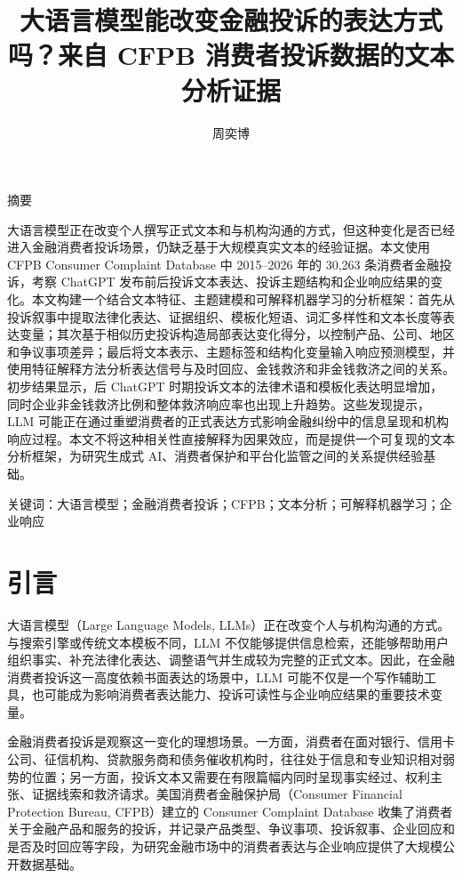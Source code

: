 \documentclass[UTF8]{ctexart}
\title{大语言模型能改变金融投诉的表达方式吗？来自 CFPB 消费者投诉数据的文本分析证据}
\author{周奕博}
\date{}
\renewenvironment{abstract}
  {\begin{center}
   {\large 摘要\par}
   \vspace{0.5em}
   \begin{minipage}{0.92\linewidth}
   \normalfont\normalsize}
  {\end{minipage}
   \end{center}}
\begin{document}
\maketitle
\begingroup
\renewcommand{\thefootnote}{}
\endgroup

\begin{abstract}
大语言模型正在改变个人撰写正式文本和与机构沟通的方式，但这种变化是否已经进入金融消费者投诉场景，仍缺乏基于大规模真实文本的经验证据。本文使用 CFPB Consumer Complaint Database 中 2015--2026 年的 30,263 条消费者金融投诉，考察 ChatGPT 发布前后投诉文本表达、投诉主题结构和企业响应结果的变化。本文构建一个结合文本特征、主题建模和可解释机器学习的分析框架：首先从投诉叙事中提取法律化表达、证据组织、模板化短语、词汇多样性和文本长度等表达变量；其次基于相似历史投诉构造局部表达变化得分，以控制产品、公司、地区和争议事项差异；最后将文本表示、主题标签和结构化变量输入响应预测模型，并使用特征解释方法分析表达信号与及时回应、金钱救济和非金钱救济之间的关系。初步结果显示，后 ChatGPT 时期投诉文本的法律术语和模板化表达明显增加，同时企业非金钱救济比例和整体救济响应率也出现上升趋势。这些发现提示，LLM 可能正在通过重塑消费者的正式表达方式影响金融纠纷中的信息呈现和机构响应过程。本文不将这种相关性直接解释为因果效应，而是提供一个可复现的文本分析框架，为研究生成式 AI、消费者保护和平台化监管之间的关系提供经验基础。

\noindent\mbox{关键词：大语言模型；金融消费者投诉；CFPB；文本分析；可解释机器学习；企业响应}
\end{abstract}

\section{引言}

大语言模型（Large Language Models, LLMs）正在改变个人与机构沟通的方式。与搜索引擎或传统文本模板不同，LLM 不仅能够提供信息检索，还能够帮助用户组织事实、补充法律化表达、调整语气并生成较为完整的正式文本。因此，在金融消费者投诉这一高度依赖书面表达的场景中，LLM 可能不仅是一个写作辅助工具，也可能成为影响消费者表达能力、投诉可读性与企业响应结果的重要技术变量。

金融消费者投诉是观察这一变化的理想场景。一方面，消费者在面对银行、信用卡公司、征信机构、贷款服务商和债务催收机构时，往往处于信息和专业知识相对弱势的位置；另一方面，投诉文本又需要在有限篇幅内同时呈现事实经过、权利主张、证据线索和救济请求。美国消费者金融保护局（Consumer Financial Protection Bureau, CFPB）建立的 Consumer Complaint Database 收集了消费者关于金融产品和服务的投诉，并记录产品类型、争议事项、投诉叙事、企业回应和是否及时回应等字段，为研究金融市场中的消费者表达与企业响应提供了大规模公开数据基础\cite{cfpb_database,cfpb_fields}。
\end{document}
